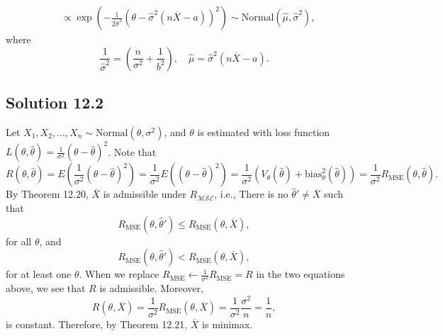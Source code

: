 \begin{itemize}
\begin{equation*}
\begin{split}
                &\propto \exp\left(-\frac{1}{2\hat{\sigma}^2} \left(\theta - \hat{\sigma}^2(n\overline{X} - a)\right)^2\right)
                \sim \mathrm{Normal}(\hat{\mu}, \hat{\sigma}^2),
        \end{split}
    \end{equation*}
    where
    \begin{equation*}
        \frac{1}{\hat{\sigma}^2} = \left(\frac{n}{\sigma^2} + \frac{1}{b^2}\right), \quad \hat{\mu} = \hat{\sigma}^2(n\overline{X} - a).
    \end{equation*}
\end{itemize}


\subsection*{Solution 12.2}

Let $X_1, X_2, ..., X_n \sim \mathrm{Normal}(\theta, \sigma^2)$, and $\theta$ is estimated with loss function $L(\theta, \hat{\theta}) = \frac{1}{\sigma^2}(\theta - \hat{\theta})^2$.
Note that
\begin{equation*}
    R(\theta, \hat{\theta}) = E\left(\frac{1}{\sigma^2}(\theta - \hat{\theta})^2\right)
        = \frac{1}{\sigma^2} E\left((\theta - \hat{\theta})^2\right)
        = \frac{1}{\sigma^2} \left(V_{\theta}(\hat{\theta}) + \mathrm{bias}^2_{\theta}(\hat{\theta})\right)
        = \frac{1}{\sigma^2} R_{\mathrm{MSE}}(\theta, \hat{\theta}).
\end{equation*}
By Theorem 12.20, $\overline{X}$ is admissible under $R_{\mathcal{MSE}}$, i.e., There is no $\hat{\theta}' \neq \overline{X}$ such that
\begin{equation*}
    R_{\mathrm{MSE}}(\theta, \hat{\theta}') \leq R_{\mathrm{MSE}}(\theta, \overline{X}),
\end{equation*}
for all $\theta$, and
\begin{equation*}
    R_{\mathrm{MSE}}(\theta, \hat{\theta}') < R_{\mathrm{MSE}}(\theta, \overline{X}),
\end{equation*}
for at least one $\theta$.
When we replace $R_{\mathrm{MSE}} \leftarrow \frac{1}{\sigma^2} R_{\mathrm{MSE}} = R$ in the two equations above, we see that $R$ is admissible.
Moreover,
\begin{equation*}
    R(\theta, \overline{X}) = \frac{1}{\sigma^2} R_{\mathrm{MSE}}(\theta, \overline{X})
        = \frac{1}{\sigma^2} \frac{\sigma^2}{n}
        = \frac{1}{n},
\end{equation*}
is constant.
Therefore, by Theorem 12.21, $\overline{X}$ is minimax.


